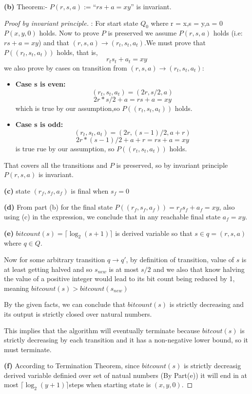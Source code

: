 \documentclass{article}
\begin{document}
\vspace{\baselineskip}
\noindent\textbf{(b)} Theorem:- $P(r, s, a) := \text{``}rs + a= xy\text{''}$ is invariant.
\begin{proof}[Proof by invariant principle]:
    For start state $Q_0$ where r = x,s = y,a = 0 $P(x,y,0)$ holds.
    Now to prove $P$ is preserved we assume $P(r,s,a)$ holds (i.e: $rs + a = xy$) and that $(r,s,a) \rightarrow (r_t,s_t,a_t)$.We must prove that $P((r_t,s_t,a_t))$ 
    holds, that is,
    \[r_ts_t + a_t = xy\]
    we also  prove by cases on transition from $(r,s,a) \rightarrow (r_t,s_t,a_t)$:
    \begin{itemize}
        \item\textbf{Case s is even:} 
            \[(r_t,s_t,a_t) = (2r,s/2,a)\]
            \[2r*s/2 + a = rs + a = xy\]
            which is true by our assumption,so $P((r_t,s_t,a_t))$ holds.
        \item\textbf{Case s is odd:}
            \[(r_t,s_t,a_t) = (2r,(s-1)/2,a+r)\] 
            \[2r*(s-1)/2 + a + r = rs + a = xy\]
            is true rue by our assumption, so $P((r_t,s_t,a_t))$ holds.
    \end{itemize}
    That covers all the transitions and $P$ is preserved, so by invariant principle $P(r,s,a)$ is invariant.
    
    \vspace{\baselineskip}
    \noindent\textbf{(c)} state $(r_f,s_f,a_f)$ is final when $s_f = 0$ 
    
    \vspace{\baselineskip}
    \noindent\textbf{(d)} From part (b) for the final state $P((r_f,s_f,a_f)) = r_f  s_f + a_f = xy$, also using (c) in the expression, we conclude that in any reachable final state $a_f = xy$. 

    \vspace{\baselineskip}
    \noindent\textbf{(e)} $bitcount(s) = \lceil \log_2(s+1)  \rceil$  is derived variable so that $s \in q = (r,s,a)$ where $q \in Q$.

    Now for some arbitrary transition $q \rightarrow q'$, by definition of transition,
    value of $s$ is at least getting halved and so $s_{new}$ is at most $s/2$ and we also that know halving the value
    of a positive integer would lead to its bit count being reduced by 1, meaning $bitcount(s) > bitcount(s_{new})$

    By the given facts, we can conclude that $bitcount(s)$ is strictly decreasing and its output is strictly closed over natural numbers.
    
    This implies that the algorithm will eventually terminate because $bitcout(s)$ is strictly decreasing by each transition and it has a non-negative lower bound, so it must terminate.

    \vspace{\baselineskip}
    \noindent\textbf{(f)} According to Termination Theorem, since $bitcount(s)$ is strictly decreasig derived variable definied over
    set of natual numbers (By Part(e)) it will end in at most $\lceil \log_2(y + 1) \rceil $steps when starting state is $(x,y,0)$.
\end{proof}
\end{document}
